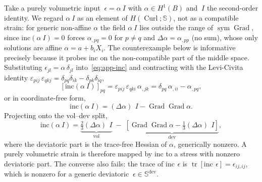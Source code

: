\documentclass[12pt]{article}
\newcommand{\Syms}{\mathbb{S}}
\newcommand{\supdev}{^{\mathrm{dev}}}
\newcommand{\Symsd}{\mathbb{S}\supdev}
\DeclareMathOperator{\trace}{tr}
\DeclareMathOperator{\dev}{dev}
\DeclareMathOperator{\vol}{vol}
\DeclareMathOperator{\Grad}{Grad}
\DeclareMathOperator{\Curl}{Curl}
\DeclareMathOperator{\sym}{sym}
\begin{document}
Take a purely volumetric input $~\epsilon = \alpha ~I$ with
$\alpha \in H^1(B)$ and $~I$ the second-order identity. We regard
$\alpha~I$ as an element of $H(\Curl; \Syms)$, not as a compatible
strain: for generic non-affine $\alpha$ the field $\alpha~I$ lies
outside the range of $\sym\Grad$, since
$\mathrm{inc}(\alpha~I) = 0$ forces $\alpha_{,pq} = 0$ for $p \neq q$
and $\Delta\alpha = \alpha_{,pp}$ (no sum), whose only solutions are
affine $\alpha = a + b_i X_i$. The counterexample below is
informative precisely because it probes $\mathrm{inc}$ on the
non-compatible part of the middle space. Substituting
$\epsilon_{jl} = \alpha\,\delta_{jl}$ into~\eqref{eq:app-inc} and
contracting with the Levi-Civita identity
$\varepsilon_{pij}\,\varepsilon_{qkj} = \delta_{pq}\delta_{ik} -
\delta_{pk}\delta_{iq}$,
\begin{equation}
  \label{eq:app-inc-vol}
  \left[\mathrm{inc}(\alpha~I)\right]_{pq}
  =
  \varepsilon_{pij}\,\varepsilon_{qki}\,\alpha_{,jk}
  =
  \delta_{pq}\,\alpha_{,ii} - \alpha_{,pq},
\end{equation}
or in coordinate-free form,
\begin{equation}
  \label{eq:app-inc-vol-cf}
  \mathrm{inc}(\alpha ~I)
  = (\Delta \alpha)\, ~I - \Grad\Grad\alpha.
\end{equation}
Projecting onto the vol--dev split,
\begin{equation}
  \label{eq:app-inc-vol-split}
  \mathrm{inc}(\alpha ~I)
  = \underbrace{\tfrac{2}{3}(\Delta\alpha)\,~I}_{\vol}
  \;-\;
  \underbrace{\!\left[\Grad\Grad\alpha - \tfrac{1}{3}(\Delta\alpha)\,~I\right]\!}_{\dev},
\end{equation}
where the deviatoric part is the trace-free Hessian of $\alpha$,
generically nonzero. A purely volumetric strain is therefore mapped
by $\mathrm{inc}$ to a stress with nonzero deviatoric part. The
converse also fails: the trace of $\mathrm{inc}\,~\epsilon$ is
$\trace[\mathrm{inc}\,~\epsilon] = \epsilon_{ij,ij}$, which is
nonzero for a generic deviatoric $~\epsilon \in \Symsd$.
\end{document}

